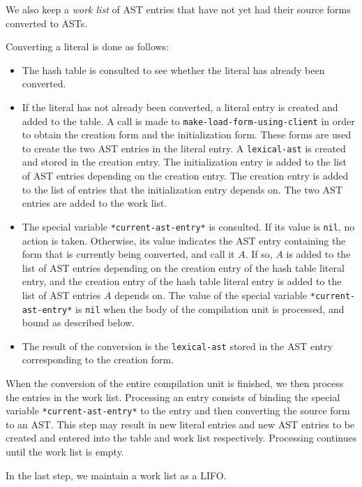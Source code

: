 We also keep a \emph{work list} of AST entries that have not yet had
their source forms converted to ASTs.

Converting a literal is done as follows:

\begin{itemize}
\item The hash table is consulted to see whether the literal has
  already been converted.
\item If the literal has not already been converted, a literal entry
  is created and added to the table.  A call is made to
  \texttt{make-load-form-using-client} in order to obtain the creation
  form and the initialization form.  These forms are used to create
  the two AST entries in the literal entry.  A \texttt{lexical-ast} is
  created and stored in the creation entry.  The initialization entry
  is added to the list of AST entries depending on the creation entry.
  The creation entry is added to the list of entries that the
  initialization entry depends on. The two AST entries are added to
  the work list.
\item The special variable \texttt{*current-ast-entry*} is consulted.
  If its value is \texttt{nil}, no action is taken.  Otherwise, its
  value indicates the AST entry containing the form that is currently
  being converted, and call it $A$.  If so, $A$ is added to the list
  of AST entries depending on the creation entry of the hash table
  literal entry, and the creation entry of the hash table literal
  entry is added to the list of AST entries $A$ depends on.  The value
  of the special variable \texttt{*current-ast-entry*} is \texttt{nil}
  when the body of the compilation unit is processed, and bound as
  described below.
\item The result of the conversion is the \texttt{lexical-ast} stored
  in the AST entry corresponding to the creation form.
\end{itemize}

When the conversion of the entire compilation unit is finished, we
then process the entries in the work list.  Processing an entry
consists of binding the special variable \texttt{*current-ast-entry*}
to the entry and then converting the source form to an AST.  This step
may result in new literal entries and new AST entries to be created
and entered into the table and work list respectively.  Processing
continues until the work list is empty.

In the last step, we maintain a work list as a LIFO.

